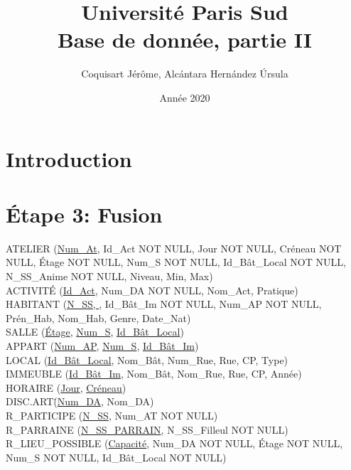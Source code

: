 \documentclass[a4paper,10.5pt]{report}
\title{\textbf{\Huge  Université Paris Sud}\\ Base de donnée, partie II}
\author{Coquisart Jérôme, Alcántara Hernández Úrsula}
\date{Année 2020}
\begin{document}
    \maketitle
    \newpage
    \newpage

    \section*{Introduction}
    \section{Étape 3: Fusion}

	ATELIER (\underline{Num\_At}, Id\_Act NOT NULL, Jour NOT NULL, Créneau NOT NULL, Étage NOT NULL, Num\_S NOT NULL, Id\_Bât\_Local NOT NULL, N\_SS\_Anime NOT NULL, Niveau, Min, Max) \\

	ACTIVITÉ (\underline{Id\_Act}, Num\_DA NOT NULL, Nom\_Act, Pratique) \\

	HABITANT (\underline{N\_SS, }, Id\_Bât\_Im NOT NULL, Num\_AP NOT NULL, Prén\_Hab, Nom\_Hab, Genre, Date\_Nat)  \\

	SALLE (\underline{Étage}, \underline{Num\_S}, \underline{Id\_Bât\_Local}) \\

	APPART (\underline{Num\_AP}, \underline{Num\_S}, \underline{Id\_Bât\_Im}) \\

	LOCAL (\underline{Id\_Bât\_Local}, Nom\_Bât, Num\_Rue, Rue, CP, Type) \\

	IMMEUBLE (\underline{Id\_Bât\_Im}, Nom\_Bât, Nom\_Rue, Rue, CP, Année) \\

	HORAIRE (\underline{Jour}, \underline{Créneau}) \\

	DISC.ART\. (\underline{Num\_DA}, Nom\_DA) \\

	R\_PARTICIPE (\underline{N\_SS}, Num\_AT NOT NULL) \\

	R\_PARRAINE (\underline{N\_SS\_PARRAIN}, N\_SS\_Filleul NOT NULL) \\

	R\_LIEU\_POSSIBLE (\underline{Capacité}, Num\_DA NOT NULL, Étage NOT NULL, Num\_S NOT NULL, Id\_Bât\_Local NOT NULL) \\
\end{document}
